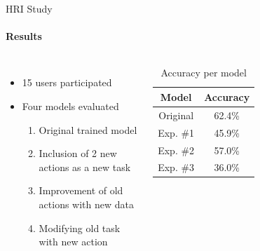 \documentclass[aspectratio=169, xcolor=dvipsnames]{beamer}
\begin{document}
\begin{frame}{HRI Study}
      \framesubtitle{Results}%
      
      \vspace{-1cm}
      \begin{columns}
      \vspace{1cm}
      \begin{itemize}
            \item 15 users participated 
            \item Four models evaluated
            {\small
            \begin{enumerate}
                  \item Original trained model
                  \item Inclusion of 2 new actions as a new task
                  \item Improvement of old actions with new data
                  \item Modifying old task with new action
            \end{enumerate}
            }
      \end{itemize}
      \vspace{-0.25cm}
      \begin{table}[ht!]
      \centering
      {\footnotesize
      \begin{tabular}{ | c | c | }
            \hline
            \rowcolor{gray!25}
            Model & Accuracy \\
            \hline
            Original & 62.4\% \\
            \hline
            Exp. \#1 & 45.9\% \\
            \hline
            Exp. \#2 & 57.0\% \\
            \hline
            Exp. \#3 & 36.0\% \\
            \hline
      \end{tabular}
      }
      \caption{Accuracy per model}
      \end{table}
      

\end{columns}
\end{frame}
\end{document}
